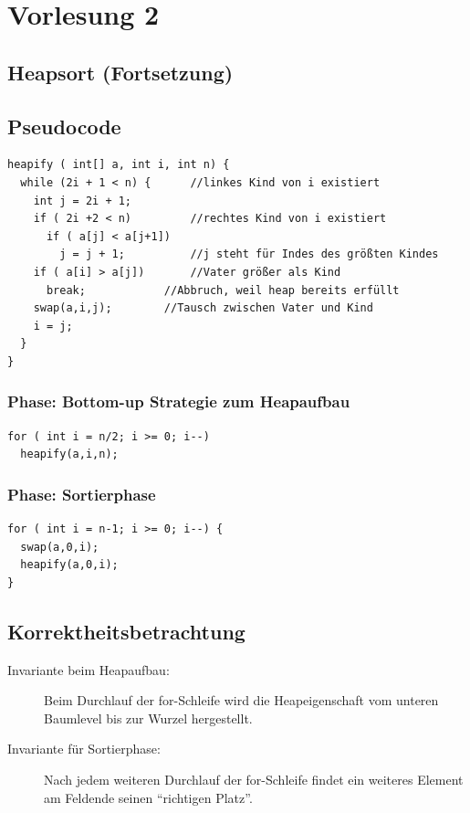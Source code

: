 \chapter{Vorlesung 2}
\section*{Heapsort (Fortsetzung)}
\section{Pseudocode}
\begin{lstlisting}
heapify ( int[] a, int i, int n) {
  while (2i + 1 < n) {		//linkes Kind von i existiert
    int j = 2i + 1;
    if ( 2i +2 < n)  		//rechtes Kind von i existiert
      if ( a[j] < a[j+1])
        j = j + 1;  		//j steht für Indes des größten Kindes
    if ( a[i] > a[j])  		//Vater größer als Kind
      break;  			//Abbruch, weil heap bereits erfüllt
    swap(a,i,j); 		//Tausch zwischen Vater und Kind
    i = j;
  }
}
\end{lstlisting}
\subsection{Phase: Bottom-up Strategie zum Heapaufbau}
\begin{lstlisting}
for ( int i = n/2; i >= 0; i--)
  heapify(a,i,n);
\end{lstlisting}
\subsection{Phase: Sortierphase}
\begin{lstlisting}
for ( int i = n-1; i >= 0; i--) {
  swap(a,0,i);
  heapify(a,0,i);
}
\end{lstlisting}
\section{Korrektheitsbetrachtung}
\begin{description}
	\item[Invariante beim Heapaufbau:] Beim Durchlauf der for-Schleife wird die Heapeigenschaft vom unteren Baumlevel bis zur Wurzel hergestellt.
	\item[Invariante für Sortierphase:] Nach jedem weiteren Durchlauf der for-Schleife findet ein weiteres Element am Feldende seinen "`richtigen Platz"'.
\end{description}

\pagebreak

